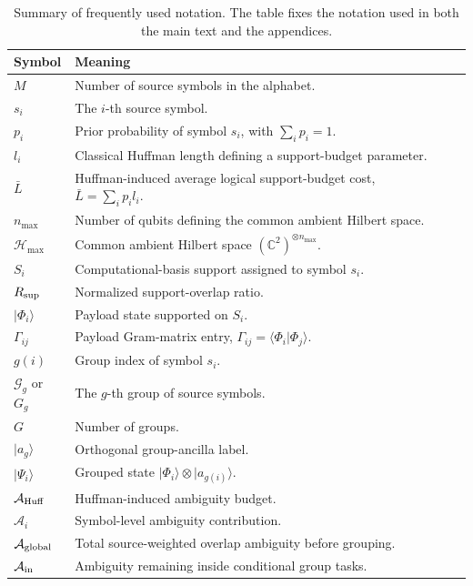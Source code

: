 \documentclass[
 reprint,
 amsmath,amssymb,
 aps,
 pra,
 floatfix,
]{revtex4-2}
\begin{document}
\begin{table}[t]
\caption{\label{tab:notation}Summary of frequently used notation. The table fixes the notation used in both the main text and the appendices.}
\scriptsize
\setlength{\tabcolsep}{4pt}
\renewcommand{\arraystretch}{0.92}
\begin{ruledtabular}
\begin{tabular}{llll}
\textbf{Symbol} & \textbf{Meaning}\\
\hline
\(M\) & Number of source symbols in the alphabet.\\
\(s_i\) & The \(i\)-th source symbol.\\
\(p_i\) & Prior probability of symbol \(s_i\), with \(\sum_i p_i=1\).\\
\(l_i\) & Classical Huffman length defining a support-budget parameter.\\
\(\bar L\) & Huffman-induced average logical support-budget cost, \(\bar L=\sum_i p_i l_i\).\\
\(n_{\max}\) & Number of qubits defining the common ambient Hilbert space.\\
\(\mathcal H_{\max}\) & Common ambient Hilbert space \((\mathbb C^2)^{\otimes n_{\max}}\).\\
\(S_i\) & Computational-basis support assigned to symbol \(s_i\).\\
\(R_{\rm sup}\) & Normalized support-overlap ratio.\\
\(|\Phi_i\rangle\) & Payload state supported on \(S_i\).\\
\(\Gamma_{ij}\) & Payload Gram-matrix entry, \(\Gamma_{ij}=\langle \Phi_i|\Phi_j\rangle\).\\
\(g(i)\) & Group index of symbol \(s_i\).\\
\(\mathcal G_g\) or \(G_g\) & The \(g\)-th group of source symbols.\\
\(G\) & Number of groups.\\
\(|a_g\rangle\) & Orthogonal group-ancilla label.\\
\(|\Psi_i\rangle\) & Grouped state \(|\Phi_i\rangle\otimes |a_{g(i)}\rangle\).\\
\(\mathcal A_{\rm Huff}\) & Huffman-induced ambiguity budget.\\
\(\mathcal A_i\) & Symbol-level ambiguity contribution.\\
\(\mathcal A_{\rm global}\) & Total source-weighted overlap ambiguity before grouping.\\
\(\mathcal A_{\rm in}\) & Ambiguity remaining inside conditional group tasks.\\

\end{tabular}
\end{ruledtabular}
\end{table}
\end{document}
